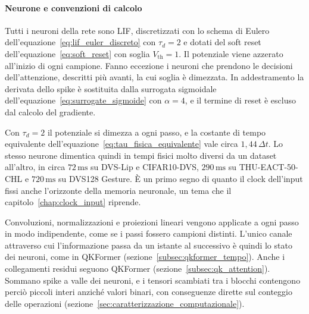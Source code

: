 \paragraph{Neurone e convenzioni di calcolo}
\label{subsec:neurone_convenzioni}

Tutti i neuroni della rete sono LIF, discretizzati con lo schema di Eulero dell'equazione~\eqref{eq:lif_euler_discreto} con $\tau_d=2$ e dotati del soft reset dell'equazione~\eqref{eq:soft_reset} con soglia $V_{\mathrm{th}}=1$. Il potenziale viene azzerato all'inizio di ogni campione. Fanno eccezione i neuroni che prendono le decisioni dell'attenzione, descritti più avanti, la cui soglia è dimezzata. In addestramento la derivata dello spike è sostituita dalla surrogata sigmoidale dell'equazione~\eqref{eq:surrogate_sigmoide} con $\alpha=4$, e il termine di reset è escluso dal calcolo del gradiente.

Con $\tau_d=2$ il potenziale si dimezza a ogni passo, e la costante di tempo equivalente dell'equazione~\eqref{eq:tau_fisica_equivalente} vale circa $1{,}44\,\Delta t$. Lo stesso neurone dimentica quindi in tempi fisici molto diversi da un dataset all'altro, in circa $72\,\mathrm{ms}$ su DVS-Lip e CIFAR10-DVS, $290\,\mathrm{ms}$ su THU-EACT-50-CHL e $720\,\mathrm{ms}$ su DVS128 Gesture. È un primo segno di quanto il clock dell'input fissi anche l'orizzonte della memoria neuronale, un tema che il capitolo~\ref{chap:clock_input} riprende.

Convoluzioni, normalizzazioni e proiezioni lineari vengono applicate a ogni passo in modo indipendente, come se i passi fossero campioni distinti. L'unico canale attraverso cui l'informazione passa da un istante al successivo è quindi lo stato dei neuroni, come in QKFormer (sezione~\ref{subsec:qkformer_tempo}). Anche i collegamenti residui seguono QKFormer (sezione~\ref{subsec:qk_attention}). Sommano spike a valle dei neuroni, e i tensori scambiati tra i blocchi contengono perciò piccoli interi anziché valori binari, con conseguenze dirette sul conteggio delle operazioni (sezione~\ref{sec:caratterizzazione_computazionale}).

